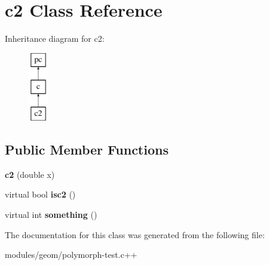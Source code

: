 \hypertarget{classc2}{\section{c2 Class Reference}
\label{classc2}
}
Inheritance diagram for c2\-:\begin{figure}[H]
\begin{center}
\leavevmode
\includegraphics[height=3.000000cm]{classc2}
\end{center}
\end{figure}
\subsection*{Public Member Functions}
\begin{DoxyCompactItemize}
\item 
\hypertarget{classc2_a524daf4971a05e02f5be0cc83366a063}{{\bfseries c2} (double x)}\label{classc2_a524daf4971a05e02f5be0cc83366a063}

\item 
\hypertarget{classc2_a22350ff2a288d6cb03ff27bdafaf815a}{virtual bool {\bfseries isc2} ()}\label{classc2_a22350ff2a288d6cb03ff27bdafaf815a}

\item 
\hypertarget{classc2_a14e540c8832b8a2fe41770012e6d3ab9}{virtual int {\bfseries something} ()}\label{classc2_a14e540c8832b8a2fe41770012e6d3ab9}

\end{DoxyCompactItemize}


The documentation for this class was generated from the following file\-:\begin{DoxyCompactItemize}
\item 
modules/geom/polymorph-\/test.\-c++\end{DoxyCompactItemize}
